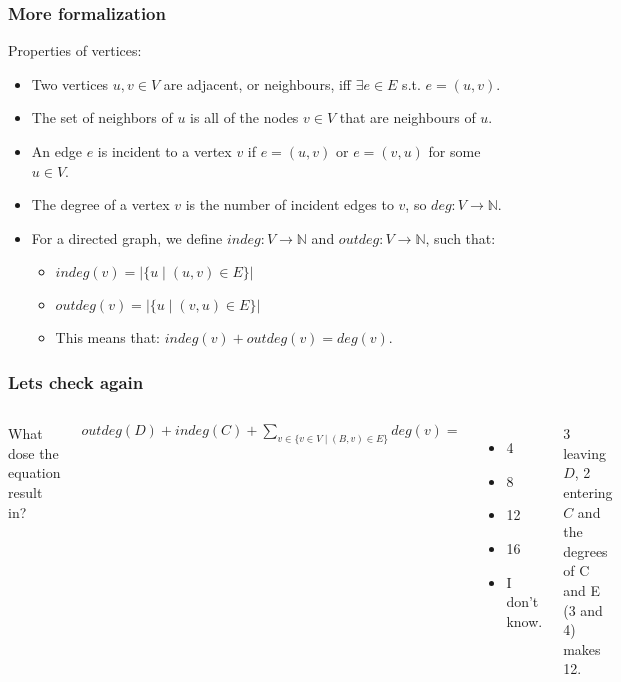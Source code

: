 \begin{frame}
	\frametitle{More formalization}
Properties of vertices:
		\begin{itemize}
			\item Two vertices $u,v \in V$ are adjacent, or neighbours, iff $\exists e \in E$ s.t. $e=(u,v)$.
				
			\item The set of neighbors of $u$ is all of the nodes $v \in V$ that are neighbours of $u$.
				
			\item An edge $e$ is incident to a vertex $v$ if $e=(u,v)$ or $e = (v,u)$ for some $u \in V$.
				
			\item The \alert{degree} of a vertex $v$ is the number of incident edges to $v$, so $\mathit{deg}: V \to \mathbb{N}$.
				
			\item For a directed graph, we define $\mathit{indeg}: V \to \mathbb{N}$ and $\mathit{outdeg}: V \to \mathbb{N}$,
				such that:
				
				\begin{itemize}
					\item $\mathit{indeg}(v) = | \{u \mid (u,v) \in E\}|$
					\item $\mathit{outdeg}(v) = | \{u \mid (v,u) \in E\}|$
						
					\item This means that: $\mathit{indeg}(v) + \mathit{outdeg}(v) = \mathit{deg}(v)$.
				\end{itemize}
		\end{itemize}
\end{frame}

\begin{frame}
	\frametitle{Lets check again}
	

	\begin{columns}[T]
				
		

		
		What dose the equation result in?

			$outdeg(D) + indeg(C) + \sum\limits_{v\in \{v \in V \mid (B,v) \in E\}} deg(v) = $

		
		\begin{itemize}
			\item 4
			\item 8
			\item 12
			\item 16
			\item I don't know.
		\end{itemize}
	
		3 leaving $D$, 2 entering $C$ and the degrees of C and E (3 and 4) makes 12.
			
	\end{columns}
\end{frame}

